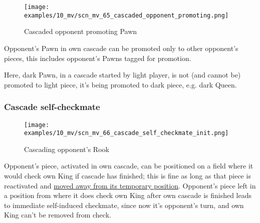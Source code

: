 \clearpage %

\vspace*{-2.1\baselineskip}
\noindent
\begin{figure}[h]
\texttt{[image: examples/10\_mv/scn\_mv\_65\_cascaded\_opponent\_promoting.png]}
\caption{Cascaded opponent promoting Pawn}
\label{fig:scn_mv_65_cascaded_opponent_promoting}
\end{figure}

Opponent's Pawn in own cascade can be promoted only to other opponent's pieces,
this includes opponent's Pawns tagged for promotion.

Here, dark Pawn, in a cascade started by light player, is not (and cannot be)
promoted to light piece, it's being promoted to dark piece, e.g. dark Queen.

\clearpage %

\subsubsection*{Cascade self-checkmate}
\label{sec:Miranda's veil/Wave/Cascading opponent/Cascade self-checkmate}

\vspace*{-1.5\baselineskip}
\noindent
\begin{figure}[h]
\texttt{[image: examples/10\_mv/scn\_mv\_66\_cascade\_self\_checkmate\_init.png]}
\vspace*{-1.4\baselineskip}
\caption{Cascading opponent's Rook}
\label{fig:scn_mv_66_cascade_self_checkmate_init}
\end{figure}

\vspace*{-0.4\baselineskip}
Opponent's piece, activated in own cascade, can be positioned on a field where
it would check own King if cascade has finished; this is fine as long as that piece
is reactivated and
\hyperref[fig:scn_mv_49_cascaded_piece_check_init]{moved away from its temporary position}.
Opponent's piece left in a position from where it does check own King after own cascade
is finished leads to immediate self-induced checkmate, since now it's opponent's turn,
and own King can't be removed from check.

\clearpage %

